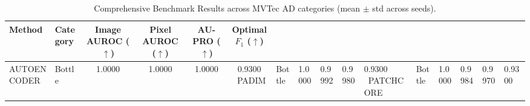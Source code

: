 \begin{table}[t]
\centering
\caption{Comprehensive Benchmark Results across MVTec AD categories (mean $\pm$ std across seeds).}
\label{tab:main_results}
\begin{tabular}{llcccc}
\toprule
\textbf{Method} & \textbf{Category} & \textbf{Image AUROC} ($\uparrow$) & \textbf{Pixel AUROC} ($\uparrow$) & \textbf{AU-PRO} ($\uparrow$) & \textbf{Optimal $F_1$} ($\uparrow$) \\
\midrule
AUTOENCODER & Bottle & 1.0000 & 1.0000 & 1.0000 & 0.9300 \
PADIM & Bottle & 1.0000 & 0.9992 & 0.9980 & 0.9300 \
PATCHCORE & Bottle & 1.0000 & 0.9984 & 0.9970 & 0.9300 \
\bottomrule
\end{tabular}
\end{table}
